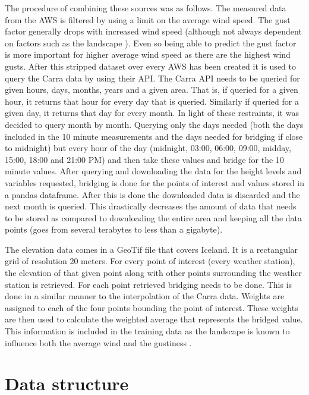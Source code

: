 The procedure of combining these sources was as follows. The measured data from the AWS is filtered by using a limit on the average wind speed. The gust factor generally drops with increased wind speed (although not always dependent on factors such as the landscape \cite{GNP_vidtal}). Even so being able to predict the gust factor is more important for higher average wind speed as there are the highest wind gusts. After this stripped dataset over every AWS has been created it is used to query the Carra data by using their API. The Carra API needs to be queried for given hours, days, months, years and a given area. That is, if queried for a given hour, it returns that hour for every day that is queried. Similarly if queried for a given day, it returns that day for every month. In light of these restraints, it was decided to query month by month. Querying only the days needed (both the days included in the 10 minute measurements and the days needed for bridging if close to midnight) but every hour of the day (midnight, 03:00, 06:00, 09:00, midday, 15:00, 18:00 and 21:00 PM) and then take these values and bridge for the 10 minute values. After querying and downloading the data for the height levels and variables requested, bridging is done for the points of interest and values stored in a pandas dataframe. After this is done the downloaded data is discarded and the next month is queried. This drastically decreases the amount of data that needs to be stored as compared to downloading the entire area and keeping all the data points (goes from several terabytes to less than a gigabyte).

The elevation data comes in a GeoTif file that covers Iceland. It is a rectangular grid of resolution 20 meters. For every point of interest (every weather station), the elevation of that given point along with other points surrounding the weather station is retrieved. For each point retrieved bridging needs to be done. This is done in a similar manner to the interpolation of the Carra data. Weights are assigned to each of the four points bounding the point of interest. These weights are then used to calculate the weighted average that represents the bridged value. This information is included in the training data as the landscape is known to influence both the average wind and the gustiness \cite{GNP_vidtal}. 


\section{Data structure}

